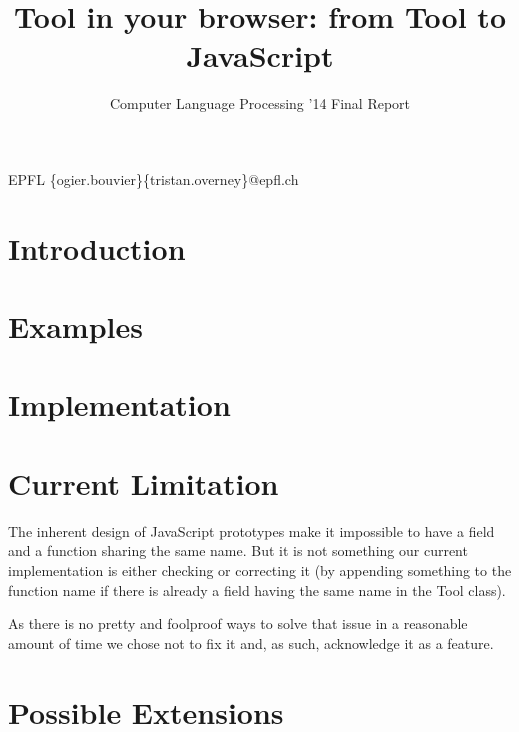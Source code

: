 \documentclass[nocopyrightspace,11pt,authoryear,preprint]{sigplanconf}
\begin{document}


\title{Tool in your browser: from Tool to JavaScript}
\subtitle{Computer Language Processing '14 Final Report}

           {EPFL}
           {\{ogier.bouvier\}\{tristan.overney\}@epfl.ch}

\maketitle

\section{Introduction}


\section{Examples}


\section{Implementation}


\section{Current Limitation}
The inherent design of JavaScript prototypes make it impossible to have a field and a function sharing the same name. But it is not something our current implementation is either checking or correcting it (by appending something to the function name if there is already a field having the same name in the Tool class).

As there is no pretty and foolproof ways to solve that issue in a reasonable amount of time we chose not to fix it and, as such, acknowledge it as a feature.

\section{Possible Extensions}




\end{document}
